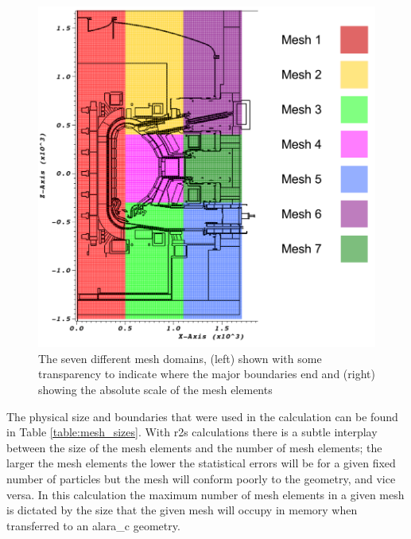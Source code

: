 \documentclass[12pt]{article}
\begin{document}
\begin{figure}[ht!]
  \centering
  \includegraphics[scale=0.4]{../plots/transport/job_splits.png}
  \caption{The seven different mesh domains, (left) shown with some transparency
           to indicate where the major boundaries end and (right) showing the
           absolute scale of the mesh elements}
  \label{fig:mesh_domains}
\end{figure}

The physical size and boundaries that were used in the calculation
can be found in Table \ref{table:mesh_sizes}. With \gls{r2s} calculations there 
is a subtle interplay between the size of the mesh elements and the number of mesh
elements; the larger the mesh elements the lower the statistical errors will be
for a given fixed number of particles but the mesh will conform poorly to the
geometry, and vice versa. In this calculation the maximum number of mesh
elements in a given mesh is dictated by the size that the given mesh will
occupy in memory when transferred to an \gls{alara_c} geometry. 
\end{document}
